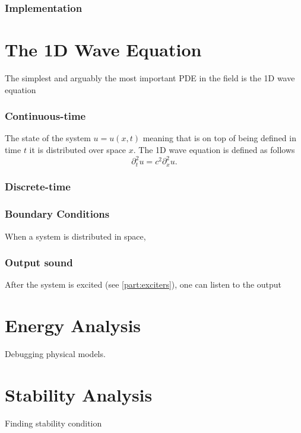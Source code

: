 \subsubsection{Implementation}


\section{%
The 1D Wave Equation}
The simplest and arguably the most important PDE in the field is the 1D wave equation



\subsubsection{Continuous-time}
The state of the system $u=u(x,t)$ meaning that is on top of being defined in time $t$ it is distributed over space $x$. The 1D wave equation is defined as follows
\begin{equation}
    \partial^2_t u = c^2 \partial^2_x u.
\end{equation}


\subsubsection{Discrete-time}

\subsubsection{Boundary Conditions}
When a system is distributed in space, 


\subsubsection{Output sound}
After the system is excited (see \ref{part:exciters}), one can listen to the output


\section{Energy Analysis}
Debugging physical models.

\section{Stability Analysis}
Finding stability condition
